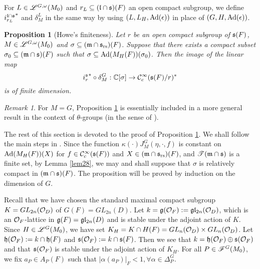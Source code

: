 \documentclass[a4paper]{amsart}
\newcommand{\fm}{{\mathfrak{m}}} \newcommand{\fn}{{\mathfrak{n}}}\newcommand{\fo}{{\mathfrak{o}}} \newcommand{\fp}{{\mathfrak{p}}}
\newtheorem{prop}[thm]{Proposition}
\theoremstyle{definition}
\theoremstyle{remark}
\newtheorem{remark}[thm]{Remark}
\numberwithin{equation}{subsection}
\begin{document}
For $L\in\mathscr{L}^{G,\omega}(M_0)$ and $r_L\subseteq({\mathfrak{l}}\cap{\mathfrak{s}})(F)$ an open compact subgroup, we define ${i_{r_L}^{{\mathfrak{l}}\cap{\mathfrak{s}}}}^*$ and $\delta_M^L$ in the same way by using $(L, L_H, {\mathrm{Ad}}(\epsilon))$ in place of $(G, H, {\mathrm{Ad}}(\epsilon))$. 

\begin{prop}[Howe's finiteness]\label{howe1}
Let $r$ be an open compact subgroup of ${\mathfrak{s}}(F)$, $M\in\mathscr{L}^{G,\omega}(M_0)$ and $\sigma\subseteq (\fm\cap\fs_\rs)(F)$. Suppose that there exists a compact subset $\sigma_0\subseteq(\fm\cap\fs)(F)$ such that $\sigma\subseteq {\mathrm{Ad}}(M_H(F))(\sigma_0)$. Then the image of the linear map
$$ {i_r^{\mathfrak{s}}}^*\circ\delta_M^G: {\mathbb {C}}[\sigma]\rightarrow{\mathcal {C}}_c^\infty({\mathfrak{s}}(F)/r)^* $$
is of finite dimension. 
\end{prop}

\begin{remark}
For $M=G$, Proposition \ref{howe1} is essentially included in a more general result \cite[Theorem 6.1]{MR1375304} in the context of $\theta$-groups (in the sense of \cite[p. 467]{zbMATH03577478}). 
\end{remark}

The rest of this section is devoted to the proof of Proposition \ref{howe1}. We shall follow the main steps in \cite[\S IV.2-6]{MR1344131}. Since the function $\kappa(\cdot)J_M^G(\eta,\cdot,f)$ is constant on ${\mathrm{Ad}}(M_H(F))(X)$ for $f\in{\mathcal {C}}_c^\infty({\mathfrak{s}}(F))$ and $X\in(\fm\cap\fs_\rs)(F)$, and $\mst(\fm\cap\fs)$ is a finite set, by Lemma \ref{lem28}, we may and shall suppose that $\sigma$ is relatively compact in $(\fm\cap\fs)(F)$. The proposition will be proved by induction on the dimension of $G$. 

Recall that we have chosen the standard maximal compact subgroup $K=GL_{2n}({\mathcal {O}}_D)$ of $G(F)=GL_{2n}(D)$. Let $k={\mathfrak{g}}({\mathcal {O}}_F):={\mathfrak{g}}{\mathfrak{l}}_{2n}({\mathcal {O}}_D)$, which is an ${\mathcal {O}}_F$-lattice in ${\mathfrak{g}}(F)={\mathfrak{g}}{\mathfrak{l}}_{2n}(D)$ and is stable under the adjoint action of $K$. Since $H\in\mathscr{L}^G(M_0)$, we have set $K_H=K\cap H(F)=GL_n({\mathcal {O}}_D)\times GL_n({\mathcal {O}}_D)$. Let ${\mathfrak{h}}({\mathcal {O}}_F):=k\cap{\mathfrak{h}}(F)$ and ${\mathfrak{s}}({\mathcal {O}}_F):=k\cap{\mathfrak{s}}(F)$. Then we see that $k={\mathfrak{h}}({\mathcal {O}}_F)\oplus{\mathfrak{s}}({\mathcal {O}}_F)$ and that ${\mathfrak{s}}({\mathcal {O}}_F)$ is stable under the adjoint action of $K_H$. For all $P\in\mathscr{F}^G(M_0)$, we fix $a_P\in A_P(F)$ such that $|\alpha(a_P)|_F<1, \forall \alpha\in\Delta_P^G$. 
\end{document}
